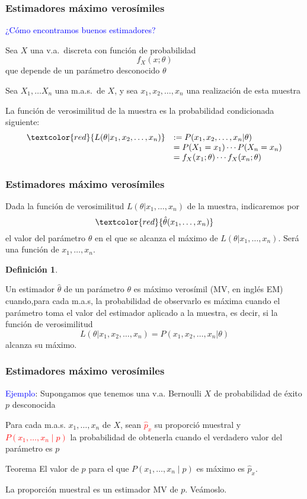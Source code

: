 \documentclass[12pt,t]{beamer}
\newcommand{\red}[1]{\textcolor{red}{#1}}
\newcommand{\blue}[1]{\textcolor{blue}{#1}}
\renewcommand{\emph}[1]{{\color{red}#1}}
\theoremstyle{plain}
\theoremstyle{definition}
\newtheorem{defin}{Definición}
\begin{document}
\begin{frame}
\frametitle{Estimadores máximo verosímiles}

\blue{¿Cómo encontramos buenos estimadores?}
\medskip

Sea $X$ una v.a.\ \emph{discreta} con función de probabilidad
$$
f_X(x;\theta)
$$
que depende de un
parámetro  desconocido $\theta$
\medskip

Sea $X_{1},\ldots X_{n}$ una m.a.s.\ de $X$, y sea $x_1,x_2,\ldots,x_n$ una realización de esta muestra
\medskip


La \emph{función de verosimilitud} de la muestra es la probabilidad condicionada siguiente:
$$
\begin{array}{rl}
\red{L(\theta|x_1,x_2,\ldots,x_n)} & := P(x_1,x_2,\ldots,x_n|\theta)\\&=P(X_1=x_1)\cdots P(X_n=x_n)\\
& = f_X(x_1;\theta)\cdots f_X(x_n;\theta)
\end{array}
$$

\end{frame}

\begin{frame}
\frametitle{Estimadores máximo verosímiles}

Dada la función de verosimilitud $L(\theta|x_1,\ldots,x_n)$ de la muestra, indicaremos por 
$$
\red{\hat{\theta}(x_1,\ldots,x_n)}
$$ 
el valor del parámetro  $\theta$ en el que  se alcanza  el máximo
de $L(\theta|x_1,\ldots,x_n)$. Será una función de $x_1,\ldots,x_n$.
\medskip


\begin{defin}
\begin{small}
Un estimador $\hat{\theta}$ de un parámetro  $\theta$ es \emph{máximo verosímil} (\emph{MV}, en inglés \emph{EM}) cuando,para  cada m.a.s, la probabilidad de observarlo  es máxima cuando el parámetro  toma el valor del estimador aplicado a la muestra,  es decir, si la función de verosimilitud
$$L(\theta|x_1,x_2,\ldots,x_n)= P(x_1,x_2,\ldots,x_n|\theta)$$
 alcanza su máximo.
 \end{small}
\end{defin}
\end{frame}

\begin{frame}
\frametitle{Estimadores máximo verosímiles}

\blue{Ejemplo}: Supongamos que tenemos una v.a. Bernoulli $X$ de probabilidad de éxito $p$ desconocida\medskip

Para cada m.a.s. $x_1,\ldots,x_n$ de $X$, sean \red{$\widehat{p}_x$}  su  proporció muestral y  \red{$P(x_1,\ldots,x_n\mid p)$} la probabilidad de obtenerla cuando  el verdadero valor del  parámetro  es $p$

\begin{block}{Teorema}
El valor de $p$ para el que $P(x_1,\ldots,x_n\mid p)$ es máximo es $\widehat{p}_x$.
\end{block}

La proporción muestral es un estimador MV de $p$. Veámoslo. 

\end{frame}
\end{document}
